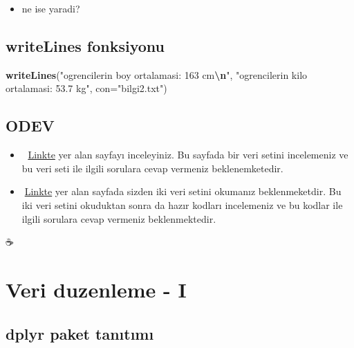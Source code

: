 \documentclass[
  oneside]{book}
\newenvironment{Shaded}{\begin{snugshade}}{\end{snugshade}}
\newcommand{\AttributeTok}[1]{\textcolor[rgb]{0.13,0.29,0.53}{#1}}
\newcommand{\FunctionTok}[1]{\textcolor[rgb]{0.13,0.29,0.53}{\textbf{#1}}}
\newcommand{\NormalTok}[1]{#1}
\newcommand{\SpecialCharTok}[1]{\textcolor[rgb]{0.81,0.36,0.00}{\textbf{#1}}}
\newcommand{\StringTok}[1]{\textcolor[rgb]{0.31,0.60,0.02}{#1}}
\providecommand{\tightlist}{%
  \setlength{\itemsep}{0pt}\setlength{\parskip}{0pt}}
\begin{document}
\begin{itemize}
\tightlist
\item
  \n ne ise yaradi?
\end{itemize}

\hypertarget{writelines-fonksiyonu}{%
\section{writeLines fonksiyonu}\label{writelines-fonksiyonu}}

\begin{Shaded}
\begin{Highlighting}[]
\FunctionTok{writeLines}\NormalTok{(}\StringTok{"ogrencilerin boy ortalamasi: 163 cm}\SpecialCharTok{\textbackslash{}n}\StringTok{"}\NormalTok{,}
            \StringTok{"ogrencilerin kilo ortalamasi: 53.7 kg"}\NormalTok{,}
            \AttributeTok{con=}\StringTok{"bilgi2.txt"}\NormalTok{)}
\end{Highlighting}
\end{Shaded}

\hypertarget{odev-2}{%
\section{ODEV}\label{odev-2}}

\begin{itemize}
\item
  🔗 \href{https://psyteachr.github.io/data-skills-v1/getting-to-know-the-data.html}{Linkte} yer alan sayfayı inceleyiniz. Bu sayfada bir veri setini incelemeniz ve bu veri seti ile ilgili sorulara cevap vermeniz beklenemketedir.
\item
  🔗\href{https://psyteachr.github.io/data-skills-v1/loading-data.html}{Linkte} yer alan sayfada sizden iki veri setini okumanız beklenmeketdir. Bu iki veri setini okuduktan sonra da hazır kodları incelemeniz ve bu kodlar ile ilgili sorulara cevap vermeniz beklenmektedir.
\end{itemize}

☕

\hypertarget{veri-duzenleme---i}{%
\chapter{Veri duzenleme - I}\label{veri-duzenleme---i}}

\hypertarget{dplyr-paket-tanux131tux131mux131}{%
\section{dplyr paket tanıtımı}\label{dplyr-paket-tanux131tux131mux131}}
\end{document}
